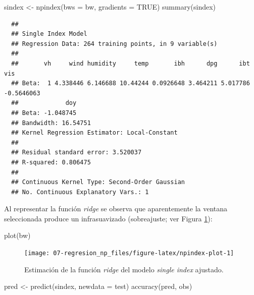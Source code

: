 \documentclass[
]{book}
\newenvironment{Shaded}{\begin{snugshade}}{\end{snugshade}}
\newcommand{\AttributeTok}[1]{\textcolor[rgb]{0.77,0.63,0.00}{#1}}
\newcommand{\ConstantTok}[1]{\textcolor[rgb]{0.00,0.00,0.00}{#1}}
\newcommand{\FunctionTok}[1]{\textcolor[rgb]{0.00,0.00,0.00}{#1}}
\newcommand{\NormalTok}[1]{#1}
\newcommand{\OtherTok}[1]{\textcolor[rgb]{0.56,0.35,0.01}{#1}}
\theoremstyle{break}
\theoremstyle{nonumberplain}
\begin{document}
\begin{Shaded}
\begin{Highlighting}[]
\NormalTok{sindex }\OtherTok{\textless{}{-}} \FunctionTok{npindex}\NormalTok{(}\AttributeTok{bws =}\NormalTok{ bw, }\AttributeTok{gradients =} \ConstantTok{TRUE}\NormalTok{)}
\FunctionTok{summary}\NormalTok{(sindex)}
\end{Highlighting}
\end{Shaded}

\begin{verbatim}
  ## 
  ## Single Index Model
  ## Regression Data: 264 training points, in 9 variable(s)
  ## 
  ##       vh     wind humidity     temp       ibh      dpg      ibt        vis
  ## Beta:  1 4.338446 6.146688 10.44244 0.0926648 3.464211 5.017786 -0.5646063
  ##             doy
  ## Beta: -1.048745
  ## Bandwidth: 16.54751
  ## Kernel Regression Estimator: Local-Constant
  ## 
  ## Residual standard error: 3.520037
  ## R-squared: 0.806475
  ## 
  ## Continuous Kernel Type: Second-Order Gaussian
  ## No. Continuous Explanatory Vars.: 1
\end{verbatim}

Al representar la función \emph{ridge} se observa que aparentemente la ventana seleccionada produce un infrasuavizado (sobreajuste; ver Figura \ref{fig:npindex-plot}):



\begin{Shaded}
\begin{Highlighting}[]
\FunctionTok{plot}\NormalTok{(bw)}
\end{Highlighting}
\end{Shaded}

\begin{figure}[!htb]

{\centering \texttt{[image: 07-regresion\_np\_files/figure-latex/npindex-plot-1]} 

}

\caption{Estimación de la función \emph{ridge} del modelo \emph{single index} ajustado.}\label{fig:npindex-plot}
\end{figure}

\begin{Shaded}
\begin{Highlighting}[]
\NormalTok{pred }\OtherTok{\textless{}{-}} \FunctionTok{predict}\NormalTok{(sindex, }\AttributeTok{newdata =}\NormalTok{ test)}
\FunctionTok{accuracy}\NormalTok{(pred, obs)}
\end{Highlighting}
\end{Shaded}
\end{document}
